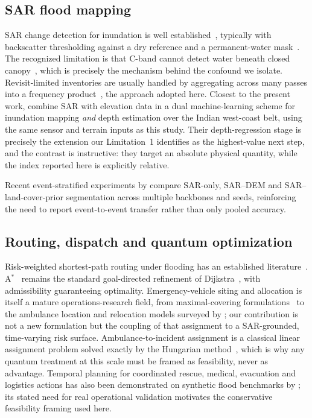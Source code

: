 \documentclass[10pt,twocolumn]{article}
\begin{document}
\subsection{SAR flood mapping}
SAR change detection for inundation is well established~\citep{martinis2009,
twele2016,shen2019}, typically with backscatter thresholding against a dry
reference and a permanent-water mask~\citep{pekel2016}. The recognized limitation
is that C-band cannot detect water beneath closed
canopy~\citep{townsend2002,tsyganskaya2018}, which is precisely the mechanism
behind the confound we isolate. Revisit-limited inventories are usually handled
by aggregating across many passes into a frequency
product~\citep{pekel2016,donchyts2016}, the approach adopted here.
Closest to the present work, \citet{sadhwani2026} combine SAR with elevation data
in a dual machine-learning scheme for inundation mapping \emph{and} depth
estimation over the Indian west-coast belt, using the same sensor and terrain
inputs as this study. Their depth-regression stage is precisely the extension our
Limitation~1 identifies as the highest-value next step, and the contrast is
instructive: they target an absolute physical quantity, while the index reported
here is explicitly relative.

Recent event-stratified experiments by \citet{thasma2026} compare SAR-only,
SAR--DEM and SAR--land-cover-prior segmentation across multiple backbones and
seeds, reinforcing the need to report event-to-event transfer rather than only
pooled accuracy.

\subsection{Routing, dispatch and quantum optimization}
Risk-weighted shortest-path routing under flooding has an established
literature~\citep{zhang2019,yin2016}. A$^\ast$~\citep{hart1968} remains the
standard goal-directed refinement of Dijkstra~\citep{dijkstra1959}, with
admissibility guaranteeing optimality. Emergency-vehicle siting and allocation is
itself a mature operations-research field, from maximal-covering
formulations~\citep{church1974} to the ambulance location and relocation models
surveyed by \citet{brotcorne2003}; our contribution is not a new formulation but
the coupling of that assignment to a SAR-grounded, time-varying risk surface.
Ambulance-to-incident assignment is a classical linear assignment problem solved
exactly by the Hungarian method~\citep{kuhn1955}, which is why any quantum
treatment at this scale must be framed as feasibility, never as advantage.
Temporal planning for coordinated rescue, medical, evacuation and logistics
actions has also been demonstrated on synthetic flood benchmarks by
\citet{siddiqui2026}; its stated need for real operational validation motivates
the conservative feasibility framing used here.
\end{document}
